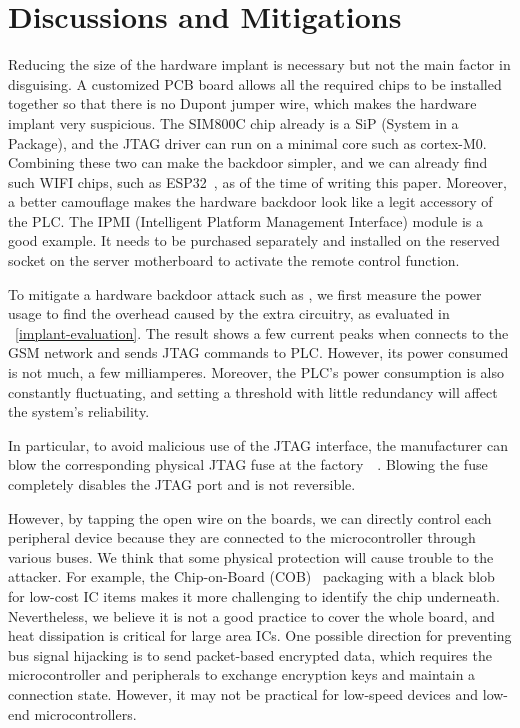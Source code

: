\section{Discussions and Mitigations}
\label{sec:implant-discussion}

Reducing the size of the hardware implant is necessary but not the main factor in disguising. A customized PCB board allows all the required chips to be installed together so that there is no Dupont jumper wire, which makes the hardware implant very suspicious. The SIM800C chip already is a SiP (System in a Package), and the JTAG driver can run on a minimal core such as cortex-M0. Combining these two can make the backdoor simpler, and we can already find such WIFI chips, such as ESP32~\cite{pravalika2019internet}, as of the time of writing this paper. Moreover, a better camouflage makes the hardware backdoor look like a legit accessory of the PLC. The IPMI (Intelligent Platform Management Interface) module is a good example. It needs to be purchased separately and installed on the reserved socket on the server motherboard to activate the remote control function.

To mitigate a hardware backdoor attack such as \name, we first measure the power usage to find the overhead caused by the extra circuitry, as evaluated in ~\autoref{implant-evaluation}. The result shows a few current peaks when \name connects to the GSM network and sends JTAG commands to PLC. However, its power consumed is not much, a few milliamperes. Moreover, the PLC's power consumption is also constantly fluctuating, and setting a threshold with little redundancy will affect the system's reliability.

In particular, to avoid malicious use of the JTAG interface, the manufacturer can blow the corresponding physical JTAG fuse at the factory~\cite{rosenfeld2010attacks}~\cite{buskey2006protected}. Blowing the fuse completely disables the JTAG port and is not reversible.

However, by tapping the open wire on the boards, we can directly control each peripheral device because they are connected to the microcontroller through various buses. We think that some physical protection will cause trouble to the attacker. For example, the Chip-on-Board (COB)~\cite{lau1994chip} packaging with a black blob for low-cost IC items makes it more challenging to identify the chip underneath. Nevertheless, we believe it is not a good practice to cover the whole board, and heat dissipation is critical for large area ICs. One possible direction for preventing bus signal hijacking is to send packet-based encrypted data, which requires the microcontroller and peripherals to exchange encryption keys and maintain a connection state. However, it may not be practical for low-speed devices and low-end microcontrollers.

